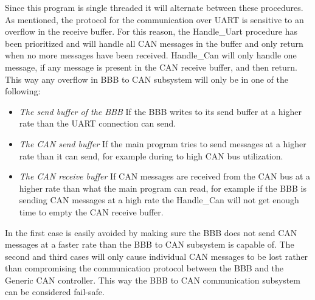 Since this program is single threaded it will alternate between these procedures. \newline 
As mentioned, the protocol for the communication over UART is sensitive to an overflow in the receive buffer. For this reason, the Handle\_Uart procedure has been prioritized and will handle all CAN messages in the buffer and only return when no more messages have been received. Handle\_Can will only handle one message, if any message is present in the CAN receive buffer, and then return. \newline
This way any overflow in BBB to CAN subsystem will only be in one of the following:

\begin{itemize}
   \item { \em The send buffer of the BBB} \newline
   If the BBB writes to its send buffer at a higher rate than the UART connection can send.
   \item { \em The CAN send buffer} \newline
   If the main program tries to send messages at a higher rate than it can send, for example during to high CAN bus utilization.
   \item { \em The CAN receive buffer} \newline
   If CAN messages are received from the CAN bus at a higher rate than what the main program can read, for example if the BBB is sending CAN messages at a high rate the Handle\_Can will not get enough time to empty the CAN receive buffer.
\end{itemize}

In the first case is easily avoided by making sure the BBB does not send CAN messages at a faster rate than the BBB to CAN subsystem is capable of. The second and third cases will only cause individual CAN messages to be lost rather than compromising the communication protocol between the BBB and the Generic CAN controller. \newline
This way the BBB to CAN communication subsystem can be considered fail-safe.